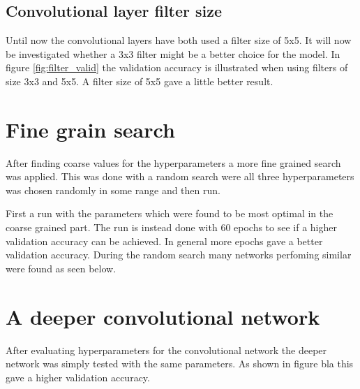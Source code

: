 
\FloatBarrier
\subsection{Convolutional layer filter size}
Until now the convolutional layers have both used a filter size of 5x5. It will now be investigated whether a 3x3 filter might be a better choice for the model. In figure \ref{fig:filter_valid} the validation accuracy is illustrated when using filters of size 3x3 and 5x5. A filter size of 5x5 gave a little better result.



\section{Fine grain search}
After finding coarse values for the hyperparameters a more fine grained search was applied. This was done with a random search were all three hyperparameters was chosen randomly in some range and then run.

First a run with the parameters which were found to be most optimal in the coarse grained part. The run is instead done with 60 epochs to see if a higher validation accuracy can be achieved. In general more epochs gave a better validation accuracy. During the random search many networks perfoming similar were found as seen below. 

\section{A deeper convolutional network}
After evaluating hyperparameters for the convolutional network the deeper network was simply tested with the same parameters. As shown in figure bla this gave a higher validation accuracy.


